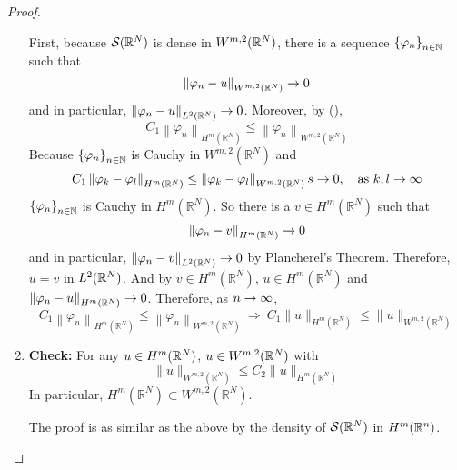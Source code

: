 \begin{proof}
\begin{enumerate}[label=(\Roman{*})]
		\noindent First, because $\mathcal{S}(\mathbb{R}^N)$ is dense in $W^{m,2}(\mathbb{R}^N)$, there is a sequence $\left\{\varphi_n\right\}_{n \in \mathbb{N}}$ such that
		\begin{equation*}
			\left\|\varphi_n-u\right\|_{W^{m, 2}\left(\mathbb{R}^N\right)} \rightarrow 0
		\end{equation*}
		and in particular, $\left\|\varphi_n-u\right\|_{L^2(\mathbb{R}^N)} \rightarrow 0$. Moreover, by (),
		\begin{equation*}
			C_1\left\|\varphi_n\right\|_{H^m\left(\mathbb{R}^N\right)} \leq\left\|\varphi_n\right\|_{W^{m, 2}\left(\mathbb{R}^N\right)}
		\end{equation*}
		Because $\left\{\varphi_n\right\}_{n \in \mathbb{N}}$ is Cauchy in $W^{m, 2}\left(\mathbb{R}^N\right)$ and 
		\begin{equation*}
			C_1\left\|\varphi_k-\varphi_l\right\|_{H^m\left(\mathbb{R}^N\right)} \leq\left\|\varphi_k-\varphi_l\right\|_{W^{m, 2}\left(\mathbb{R}^N\right)} s\to 0,\quad \text{as } k,l \rightarrow \infty
		\end{equation*}
		$\left\{\varphi_n\right\}_{n \in \mathbb{N}}$ is Cauchy in $H^m\left(\mathbb{R}^N\right)$. So there is a $v \in H^m\left(\mathbb{R}^N\right)$ such that
		\begin{equation*}
			\left\|\varphi_n-v\right\|_{H^m\left(\mathbb{R}^N\right)} \rightarrow 0
		\end{equation*}
		and in particular, $\left\|\varphi_n-v\right\|_{L^2(\mathbb{R}^N)} \rightarrow 0$ by Plancherel's Theorem. Therefore, $u = v$ in $L^2(\mathbb{R}^N)$. And by $v \in H^m\left(\mathbb{R}^N\right)$, $u \in H^m\left(\mathbb{R}^N\right)$ and $\left\|\varphi_n-u\right\|_{H^m\left(\mathbb{R}^N\right)} \rightarrow 0$. Therefore, as $n \rightarrow \infty$,
		\begin{equation*}
			C_1\left\|\varphi_n\right\|_{H^m\left(\mathbb{R}^N\right)} \leq\left\|\varphi_n\right\|_{W^{m, 2}\left(\mathbb{R}^N\right)} ~\Rightarrow~C_1\|u\|_{H^m\left(\mathbb{R}^N\right)} \leq\|u\|_{W^{m, 2}\left(\mathbb{R}^N\right)}
		\end{equation*}

		\item \textbf{Check:} For any $u \in H^m(\mathbb{R}^N)$, $u \in W^{m,2}(\mathbb{R}^N)$ with
		\begin{equation*}
			\|u\|_{W^{m, 2}\left(\mathbb{R}^N\right)} \leq C_2\|u\|_{H^m\left(\mathbb{R}^N\right)}
		\end{equation*}
		In particular, $H^m\left(\mathbb{R}^N\right) \subset W^{m, 2}\left(\mathbb{R}^N\right)$.

		\noindent The proof is as similar as the above by the density of $\mathcal{S}(\mathbb{R}^N)$ in $H^m(\mathbb{R}^n)$.
	\end{enumerate}
\end{proof}

